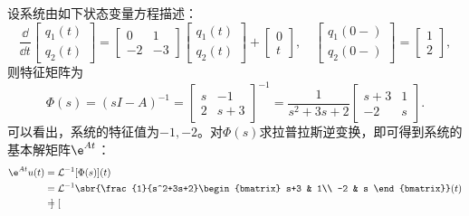 \begin{example}
    设系统由如下状态变量方程描述：
    \begin{equation}
        \frac{\dd}{\dd t}\begin{bmatrix}
            q_1(t)\\
            q_2(t)
        \end{bmatrix}=\begin{bmatrix}
            0 & 1\\
            -2 & -3
        \end{bmatrix}\begin{bmatrix}
            q_1(t)\\
            q_2(t)
        \end{bmatrix}+\begin{bmatrix}
            0\\
            t
        \end{bmatrix},\quad\begin{bmatrix}
            q_1(0-)\\
            q_2(0-)
        \end{bmatrix}=\begin{bmatrix}
            1\\
            2
        \end{bmatrix},
    \end{equation}
    则特征矩阵为
    \begin{equation}
        \Phi(s)=(sI-A)^{-1}=\begin{bmatrix}
            s & -1\\
            2 & s+3
        \end{bmatrix}^{-1}=\frac{1}{s^2+3s+2}\begin{bmatrix}
            s+3 & 1\\
            -2 & s
        \end{bmatrix}.
    \end{equation}
    可以看出，系统的特征值为$-1,-2$。对$\Phi(s)$求拉普拉斯逆变换，即可得到系统的基本解矩阵$\e^{At}$：
    \begin{align}
        \e^{At}u(t)&=\mathcal{L}^{-1}[\Phi(s)](t)\nonumber\\
        &=\mathcal{L}^{-1}\sbr{\frac{1}{s^2+3s+2}\begin{bmatrix}
            s+3 & 1\\
            -2 & s
        \end{bmatrix}}(t)\nonumber\\
        &=\begin{bmatrix}

\end{bmatrix}
\end{align}
\end{example}
